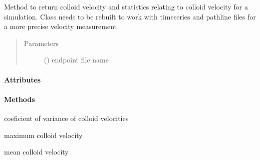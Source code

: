 \documentclass[letterpaper,10pt,english]{sphinxmanual}
\begin{document}
\begin{fulllineitems}
\label{\detokenize{index:lb_colloids.Colloids.Colloid_output.ColloidVelocity}}
Method to return colloid velocity and statistics
relating to colloid velocity for a simulation. Class
needs to be rebuilt to work with timeseries and pathline
files for a more precise velocity measurement
\begin{quote}\begin{description}
\item[{Parameters}] \leavevmode
{} () \textendash{} endpoint file name

\end{description}\end{quote}
\paragraph{Attributes}
\paragraph{Methods}

\begin{fulllineitems}
\label{\detokenize{index:lb_colloids.Colloids.Colloid_output.ColloidVelocity.cv}}
 \textendash{} coeficient of variance of colloid velocities

\end{fulllineitems}


\begin{fulllineitems}
\label{\detokenize{index:lb_colloids.Colloids.Colloid_output.ColloidVelocity.max}}
 \textendash{} maximum colloid velocity

\end{fulllineitems}


\begin{fulllineitems}
\label{\detokenize{index:lb_colloids.Colloids.Colloid_output.ColloidVelocity.mean}}
 \textendash{} mean colloid velocity


\end{fulllineitems}
\end{fulllineitems}
\end{document}
